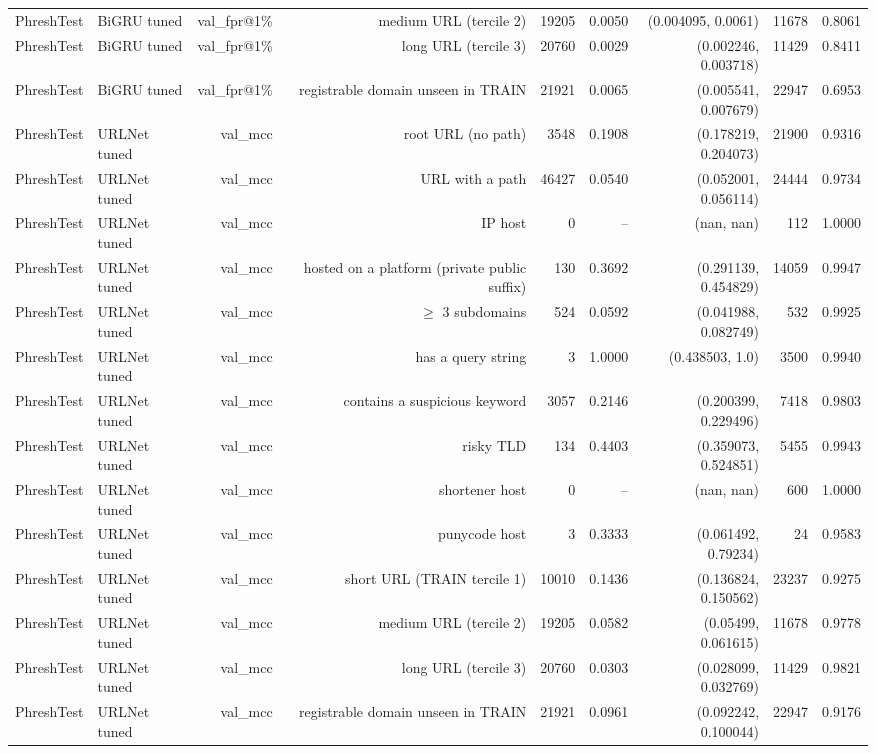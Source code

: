 \begin{table}[t]
\begin{tabular}{llrrrrrrr}
PhreshTest & BiGRU tuned & val\_fpr@1\% & medium URL (tercile 2) & 19205 & 0.0050 & (0.004095, 0.0061) & 11678 & 0.8061 \\
PhreshTest & BiGRU tuned & val\_fpr@1\% & long URL (tercile 3) & 20760 & 0.0029 & (0.002246, 0.003718) & 11429 & 0.8411 \\
PhreshTest & BiGRU tuned & val\_fpr@1\% & registrable domain unseen in TRAIN & 21921 & 0.0065 & (0.005541, 0.007679) & 22947 & 0.6953 \\
PhreshTest & URLNet tuned & val\_mcc & root URL (no path) & 3548 & 0.1908 & (0.178219, 0.204073) & 21900 & 0.9316 \\
PhreshTest & URLNet tuned & val\_mcc & URL with a path & 46427 & 0.0540 & (0.052001, 0.056114) & 24444 & 0.9734 \\
PhreshTest & URLNet tuned & val\_mcc & IP host & 0 & -- & (nan, nan) & 112 & 1.0000 \\
PhreshTest & URLNet tuned & val\_mcc & hosted on a platform (private public suffix) & 130 & 0.3692 & (0.291139, 0.454829) & 14059 & 0.9947 \\
PhreshTest & URLNet tuned & val\_mcc & $\geq$ 3 subdomains & 524 & 0.0592 & (0.041988, 0.082749) & 532 & 0.9925 \\
PhreshTest & URLNet tuned & val\_mcc & has a query string & 3 & 1.0000 & (0.438503, 1.0) & 3500 & 0.9940 \\
PhreshTest & URLNet tuned & val\_mcc & contains a suspicious keyword & 3057 & 0.2146 & (0.200399, 0.229496) & 7418 & 0.9803 \\
PhreshTest & URLNet tuned & val\_mcc & risky TLD & 134 & 0.4403 & (0.359073, 0.524851) & 5455 & 0.9943 \\
PhreshTest & URLNet tuned & val\_mcc & shortener host & 0 & -- & (nan, nan) & 600 & 1.0000 \\
PhreshTest & URLNet tuned & val\_mcc & punycode host & 3 & 0.3333 & (0.061492, 0.79234) & 24 & 0.9583 \\
PhreshTest & URLNet tuned & val\_mcc & short URL (TRAIN tercile 1) & 10010 & 0.1436 & (0.136824, 0.150562) & 23237 & 0.9275 \\
PhreshTest & URLNet tuned & val\_mcc & medium URL (tercile 2) & 19205 & 0.0582 & (0.05499, 0.061615) & 11678 & 0.9778 \\
PhreshTest & URLNet tuned & val\_mcc & long URL (tercile 3) & 20760 & 0.0303 & (0.028099, 0.032769) & 11429 & 0.9821 \\
PhreshTest & URLNet tuned & val\_mcc & registrable domain unseen in TRAIN & 21921 & 0.0961 & (0.092242, 0.100044) & 22947 & 0.9176 \\

\end{tabular}
\end{table}
